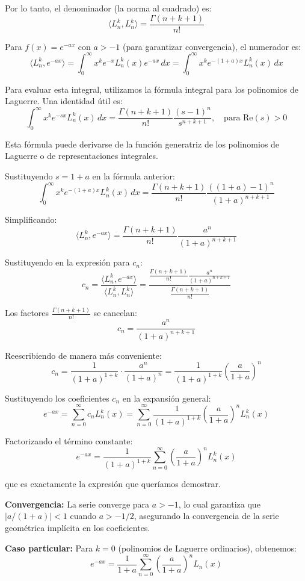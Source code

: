 \documentclass[a4paper]{article}
\begin{document}
Por lo tanto, el denominador (la norma al cuadrado) es:
$$\langle L_n^k, L_n^k \rangle = \frac{\Gamma(n+k+1)}{n!}$$


Para $f(x) = e^{-ax}$ con $a > -1$ (para garantizar convergencia), el numerador es:
$$\langle L_n^k, e^{-ax} \rangle = \int_0^{\infty} x^k e^{-x} L_n^k(x) e^{-ax} \, dx = \int_0^{\infty} x^k e^{-(1+a)x} L_n^k(x) \, dx$$

Para evaluar esta integral, utilizamos la fórmula integral para los polinomios de Laguerre. Una identidad útil es:
$$\int_0^{\infty} x^k e^{-sx} L_n^k(x) \, dx = \frac{\Gamma(n+k+1)}{n!} \frac{(s-1)^n}{s^{n+k+1}}, \quad \text{para } \text{Re}(s) > 0$$

Esta fórmula puede derivarse de la función generatriz de los polinomios de Laguerre o de representaciones integrales.


Sustituyendo $s = 1+a$ en la fórmula anterior:
$$\int_0^{\infty} x^k e^{-(1+a)x} L_n^k(x) \, dx = \frac{\Gamma(n+k+1)}{n!} \frac{((1+a)-1)^n}{(1+a)^{n+k+1}}$$

Simplificando:
$$\langle L_n^k, e^{-ax} \rangle = \frac{\Gamma(n+k+1)}{n!} \frac{a^n}{(1+a)^{n+k+1}}$$


Sustituyendo en la expresión para $c_n$:
$$c_n = \frac{\langle L_n^k, e^{-ax} \rangle}{\langle L_n^k, L_n^k \rangle} = \frac{\frac{\Gamma(n+k+1)}{n!} \frac{a^n}{(1+a)^{n+k+1}}}{\frac{\Gamma(n+k+1)}{n!}}$$

Los factores $\frac{\Gamma(n+k+1)}{n!}$ se cancelan:
$$c_n = \frac{a^n}{(1+a)^{n+k+1}}$$

Reescribiendo de manera más conveniente:
$$c_n = \frac{1}{(1+a)^{1+k}} \cdot \frac{a^n}{(1+a)^n} = \frac{1}{(1+a)^{1+k}} \left(\frac{a}{1+a}\right)^n$$

Sustituyendo los coeficientes $c_n$ en la expansión general:
$$e^{-ax} = \sum_{n=0}^{\infty} c_n L_n^k(x) = \sum_{n=0}^{\infty} \frac{1}{(1+a)^{1+k}} \left(\frac{a}{1+a}\right)^n L_n^k(x)$$

Factorizando el término constante:
$$e^{-ax} = \frac{1}{(1+a)^{1+k}} \sum_{n=0}^{\infty} \left(\frac{a}{1+a}\right)^n L_n^k(x)$$

que es exactamente la expresión que queríamos demostrar.

\textbf{Convergencia:} La serie converge para $a > -1$, lo cual garantiza que $|a/(1+a)| < 1$ cuando $a > -1/2$, asegurando la convergencia de la serie geométrica implícita en los coeficientes.

\textbf{Caso particular:} Para $k=0$ (polinomios de Laguerre ordinarios), obtenemos:
$$e^{-ax} = \frac{1}{1+a} \sum_{n=0}^{\infty} \left(\frac{a}{1+a}\right)^n L_n(x)$$
\end{document}
